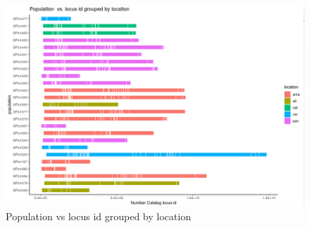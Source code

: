 \documentclass{article}
\begin{document}
\begin{figure}[h]
    \centering
    \includegraphics[width=1.5\textwidth]{haplotypes_1.png}
    \caption{Population vs locus id grouped by location}
    \label{fig:fig1}
\end{figure}
\end{document}
